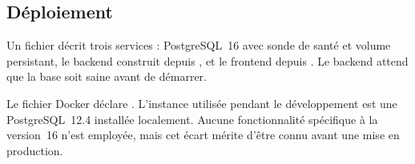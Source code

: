 \subsection{Déploiement}

Un fichier  décrit trois services : PostgreSQL~16 avec sonde
de santé et volume persistant, le backend construit depuis , et
le frontend depuis . Le backend attend que la base soit saine
avant de démarrer.

\begin{remarque}
Le fichier Docker déclare . L'instance utilisée pendant le
développement est une PostgreSQL~12.4 installée localement. Aucune fonctionnalité
spécifique à la version~16 n'est employée, mais cet écart mérite d'être connu avant une
mise en production.
\end{remarque}
